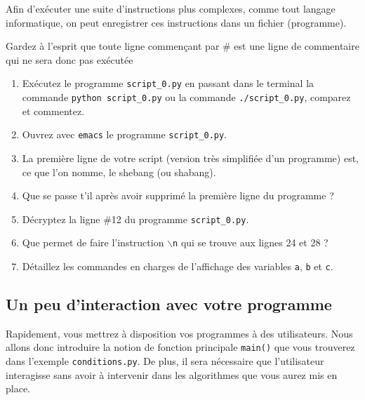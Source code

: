 Afin d'exécuter  une suite  d'instructions plus complexes,  comme tout
langage  informatique, on  peut enregistrer  ces instructions  dans un
fichier (programme).

Gardez à l'esprit  que toute ligne commençant par \#  est une ligne de
commentaire qui ne sera donc pas exécutée

\begin{enumerate}
\item Exécutez  le programme \texttt{script\_0.py} en  passant dans le
  terminal  la commande  \texttt{python script\_0.py}  ou la  commande
  \texttt{./script\_0.py}, comparez et commentez.

\item Ouvrez avec \texttt{emacs} le programme \texttt{script\_0.py}.

\item La première ligne de  votre script (version très simplifiée d'un
  programme) est, ce que l'on nomme, le shebang (ou shabang).

\item Que  se passe  t'il après  avoir supprimé  la première  ligne du
  programme ?

\item Décryptez la ligne \#12 du programme \texttt{script\_0.py}.

\item Que permet de  faire l'instruction \texttt{$\backslash$n} qui se
  trouve aux lignes 24 et 28 ?

\item Détaillez les commandes en  charges de l'affichage des variables
  \texttt{a}, \texttt{b} et \texttt{c}.


\end{enumerate}


\subsection{Un peu d'interaction avec votre programme}


Rapidement,  vous   mettrez  à   disposition  vos  programmes   à  des
utilisateurs.   Nous  allons donc  introduire  la  notion de  fonction
principale   \texttt{main()}  que   vous   trouverez  dans   l'exemple
\texttt{conditions.py}.  De plus, il sera nécessaire que l'utilisateur
interagisse  sans avoir  à intervenir  dans les  algorithmes que  vous
aurez mis en place.


